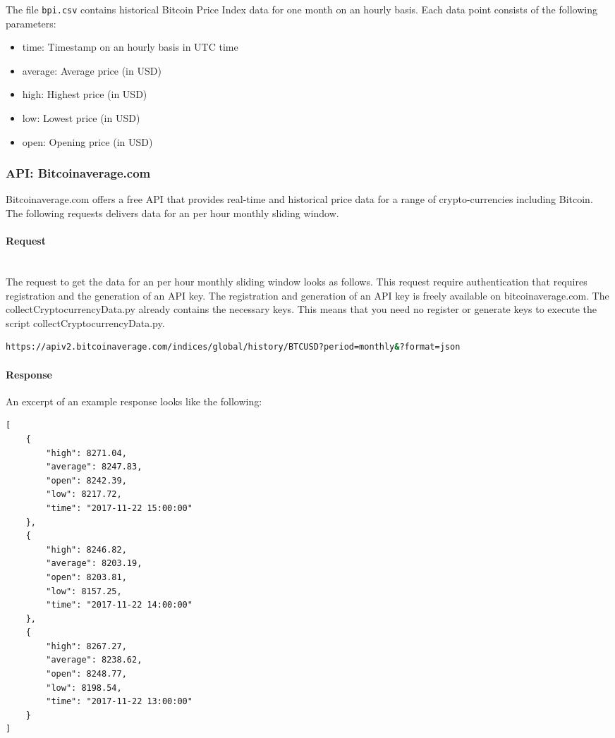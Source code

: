 \documentclass[a4paper,12pt]{article}
\begin{document}
\begin{spacing}{1.2}
The file \verb|bpi.csv| contains historical Bitcoin Price Index data for one month on an hourly basis. Each data point consists of the following parameters:
\begin{itemize}
    \item time: Timestamp on an hourly basis in UTC time
    \item average: Average price (in USD)
    \item high: Highest price (in USD)
    \item low: Lowest price (in USD)
    \item open: Opening price (in USD)
\end{itemize}

\subsubsection{API: Bitcoinaverage.com}
Bitcoinaverage.com offers a free API that provides real-time and historical price data for a range of crypto-currencies including Bitcoin. The following requests delivers data for an per hour monthly sliding window.
\paragraph{Request}\mbox{}\\
The request to get the data for an per hour monthly sliding window looks as follows. This request require authentication that requires registration and the generation of an API key. The registration and generation of an API key is freely available on bitcoinaverage.com. The collectCryptocurrencyData.py already contains the necessary keys. This means that you need no register or generate keys to execute the script collectCryptocurrencyData.py.  
\begin{lstlisting}[language=bash]
https://apiv2.bitcoinaverage.com/indices/global/history/BTCUSD?period=monthly&?format=json
\end{lstlisting}
\paragraph{Response}
An excerpt of an example response looks like the following:
\begin{lstlisting}
[
    {
        "high": 8271.04, 
        "average": 8247.83, 
        "open": 8242.39,
        "low": 8217.72, 
        "time": "2017-11-22 15:00:00"
    }, 
    {
        "high": 8246.82,
        "average": 8203.19,
        "open": 8203.81,
        "low": 8157.25,
        "time": "2017-11-22 14:00:00"
    }, 
    {
        "high": 8267.27, 
        "average": 8238.62, 
        "open": 8248.77, 
        "low": 8198.54, 
        "time": "2017-11-22 13:00:00"
    }
]
\end{lstlisting}



\end{spacing}
\end{document}
